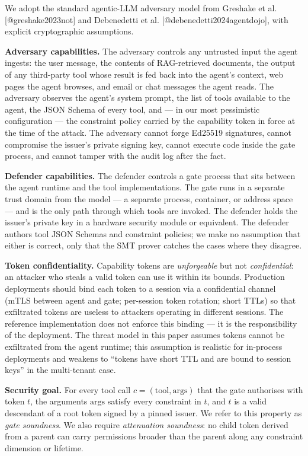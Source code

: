 We adopt the standard agentic-LLM adversary model from Greshake et al.
{[}@greshake2023not{]} and Debenedetti et al.
{[}@debenedetti2024agentdojo{]}, with explicit cryptographic
assumptions.

\textbf{Adversary capabilities.} The adversary controls any untrusted
input the agent ingests: the user message, the contents of RAG-retrieved
documents, the output of any third-party tool whose result is fed back
into the agent's context, web pages the agent browses, and email or chat
messages the agent reads. The adversary observes the agent's system
prompt, the list of tools available to the agent, the JSON Schema of
every tool, and --- in our most pessimistic configuration --- the
constraint policy carried by the capability token in force at the time
of the attack. The adversary cannot forge Ed25519 signatures, cannot
compromise the issuer's private signing key, cannot execute code inside
the gate process, and cannot tamper with the audit log after the fact.

\textbf{Defender capabilities.} The defender controls a gate process
that sits between the agent runtime and the tool implementations. The
gate runs in a separate trust domain from the model --- a separate
process, container, or address space --- and is the only path through
which tools are invoked. The defender holds the issuer's private key in
a hardware security module or equivalent. The defender authors tool JSON
Schemas and constraint policies; we make no assumption that either is
correct, only that the SMT prover catches the cases where they disagree.

\textbf{Token confidentiality.} Capability tokens are \emph{unforgeable}
but not \emph{confidential}: an attacker who steals a valid token can
use it within its bounds. Production deployments should bind each token
to a session via a confidential channel (mTLS between agent and gate;
per-session token rotation; short TTLs) so that exfiltrated tokens are
useless to attackers operating in different sessions. The reference
implementation does not enforce this binding --- it is the
responsibility of the deployment. The threat model in this paper assumes
tokens cannot be exfiltrated from the agent runtime; this assumption is
realistic for in-process deployments and weakens to ``tokens have short
TTL and are bound to session keys'' in the multi-tenant case.

\textbf{Security goal.} For every tool call
\(c = (\text{tool}, \text{args})\) that the gate authorises with token
\(t\), the arguments \(\text{args}\) satisfy every constraint in \(t\),
and \(t\) is a valid descendant of a root token signed by a pinned
issuer. We refer to this property as \emph{gate soundness}. We also
require \emph{attenuation soundness}: no child token derived from a
parent can carry permissions broader than the parent along any
constraint dimension or lifetime.

